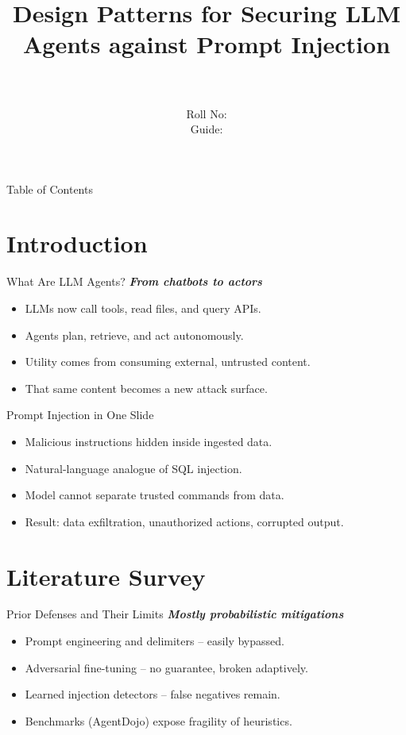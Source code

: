 \documentclass{beamer}
\title[\seminarShortTitle]{Design Patterns for Securing LLM Agents against Prompt Injection}
\author[\seminarName\ (\seminarShortCollege)]{\seminarName \\ \seminarRoll \\ Roll No: \seminarClassRoll \\ Guide: \seminarGuide}
\institute[\seminarShortCollege]{\seminarDept \\ \seminarCollege}
\date{\seminarDate}
\begin{document}
\begin{frame}\titlepage\end{frame}
\begin{frame}{Table of Contents}\tableofcontents\end{frame}
\section{Introduction}
\begin{frame}{What Are LLM Agents?}
\textbf{\textit{From chatbots to actors}}
\begin{itemize}
\item LLMs now call tools, read files, and query APIs.
\item Agents plan, retrieve, and act autonomously.
\item Utility comes from consuming external, untrusted content.
\item That same content becomes a new attack surface.
\end{itemize}
\end{frame}

\begin{frame}{Prompt Injection in One Slide}
\begin{itemize}
\item Malicious instructions hidden inside ingested data.
\item Natural-language analogue of SQL injection.
\item Model cannot separate trusted commands from data.
\item Result: data exfiltration, unauthorized actions, corrupted output.
\end{itemize}
\end{frame}

\section{Literature Survey}
\begin{frame}{Prior Defenses and Their Limits}
\textbf{\textit{Mostly probabilistic mitigations}}
\begin{itemize}
\item Prompt engineering and delimiters -- easily bypassed.
\item Adversarial fine-tuning -- no guarantee, broken adaptively.
\item Learned injection detectors -- false negatives remain.
\item Benchmarks (AgentDojo) expose fragility of heuristics.
\end{itemize}
\end{frame}
\end{document}
